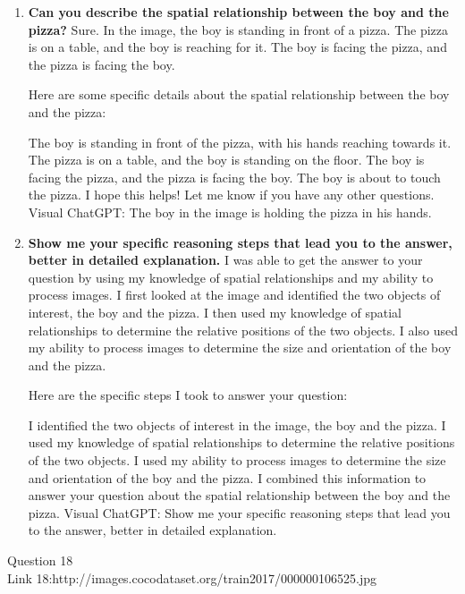     \begin{enumerate}
        \item \textbf{Can you describe the spatial relationship between the boy and the pizza?}
        \subitem 
        Sure. In the image, the boy is standing in front of a pizza. The pizza is on a table, and the boy is reaching for it. The boy is facing the pizza, and the pizza is facing the boy.
        
        Here are some specific details about the spatial relationship between the boy and the pizza:
        
        The boy is standing in front of the pizza, with his hands reaching towards it.
        The pizza is on a table, and the boy is standing on the floor.
        The boy is facing the pizza, and the pizza is facing the boy.
        The boy is about to touch the pizza.
        I hope this helps! Let me know if you have any other questions.
        \subitem Visual ChatGPT: The boy in the image is holding the pizza in his hands.
        \item \textbf{Show me your specific reasoning steps that lead you to the answer, better in detailed explanation.}
        \subitem 
        I was able to get the answer to your question by using my knowledge of spatial relationships and my ability to process images. I first looked at the image and identified the two objects of interest, the boy and the pizza. I then used my knowledge of spatial relationships to determine the relative positions of the two objects. I also used my ability to process images to determine the size and orientation of the boy and the pizza.
        
        Here are the specific steps I took to answer your question:
        
        I identified the two objects of interest in the image, the boy and the pizza.
        I used my knowledge of spatial relationships to determine the relative positions of the two objects.
        I used my ability to process images to determine the size and orientation of the boy and the pizza.
        I combined this information to answer your question about the spatial relationship between the boy and the pizza.
        \subitem Visual ChatGPT: Show me your specific reasoning steps that lead you to the answer, better in detailed explanation.
    \end{enumerate}
Question 18\\
Link 18:http://images.cocodataset.org/train2017/000000106525.jpg
